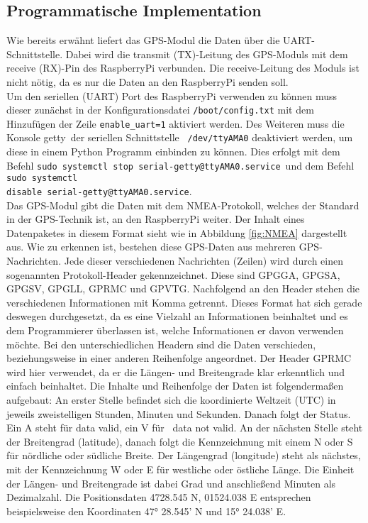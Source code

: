 \subsection{Programmatische Implementation}
\label{subsec:GPSprogram}
Wie bereits erwähnt liefert das GPS-Modul die Daten über die UART-Schnittstelle. Dabei wird die transmit (TX)-Leitung des GPS-Moduls mit dem receive (RX)-Pin des RaspberryPi verbunden. Die receive-Leitung des Moduls ist nicht nötig, da es nur die Daten an den RaspberryPi senden soll.\\
Um den seriellen (UART) Port des RaspberryPi verwenden zu können muss dieser zunächst in der Konfigurationsdatei  \verb|/boot/config.txt| mit dem Hinzufügen der Zeile \verb|enable_uart=1| aktiviert werden. Des Weiteren muss die Konsole \glqq getty\grqq\ der seriellen Schnittstelle \verb| /dev/ttyAMA0| deaktiviert werden, um diese in einem Python Programm einbinden zu können. Dies erfolgt mit dem Befehl \verb|sudo systemctl stop serial-getty@ttyAMA0.service|\ und dem Befehl \verb|sudo systemctl|\\
\verb|disable serial-getty@ttyAMA0.service|.\\
Das \ac{GPS}-Modul gibt die Daten mit dem \ac{NMEA}-Protokoll, welches der Standard in der GPS-Technik ist, an den RaspberryPi weiter. Der Inhalt eines Datenpaketes in diesem Format sieht wie in Abbildung \ref{fig:NMEA} dargestellt aus. Wie zu erkennen ist, bestehen diese \ac{GPS}-Daten aus mehreren \ac{GPS}-Nachrichten. Jede dieser verschiedenen Nachrichten (Zeilen) wird durch einen sogenannten Protokoll-Header gekennzeichnet. Diese sind GPGGA, GPGSA, GPGSV, GPGLL, GPRMC und GPVTG. Nachfolgend an den Header stehen die verschiedenen Informationen mit Komma getrennt. Dieses Format hat sich gerade deswegen durchgesetzt, da es eine Vielzahl an Informationen beinhaltet und es dem Programmierer überlassen ist, welche Informationen er davon verwenden möchte. Bei den unterschiedlichen Headern sind die Daten verschieden, beziehungsweise in einer anderen Reihenfolge angeordnet. Der Header GPRMC wird hier verwendet, da er die Längen- und Breitengrade klar erkenntlich und einfach beinhaltet. Die Inhalte und Reihenfolge der Daten ist folgendermaßen aufgebaut: An erster Stelle befindet sich die koordinierte Weltzeit (UTC) in jeweils zweistelligen Stunden, Minuten und Sekunden. Danach folgt der Status. Ein A steht für \glqq data valid\grqq , ein V für \glqq\ data not valid\grqq . An der nächsten Stelle steht der Breitengrad (latitude), danach folgt die Kennzeichnung mit einem N oder S für \glqq nördliche oder südliche Breite\grqq . Der Längengrad (longitude) steht als nächstes, mit der Kennzeichnung W oder E für \glqq westliche oder östliche Länge\grqq . Die Einheit der Längen- und Breitengrade ist dabei Grad und anschließend Minuten als Dezimalzahl. Die Positionsdaten 4728.545 N, 01524.038 E entsprechen beispielsweise den Koordinaten 47° 28.545' N und 15° 24.038' E.

